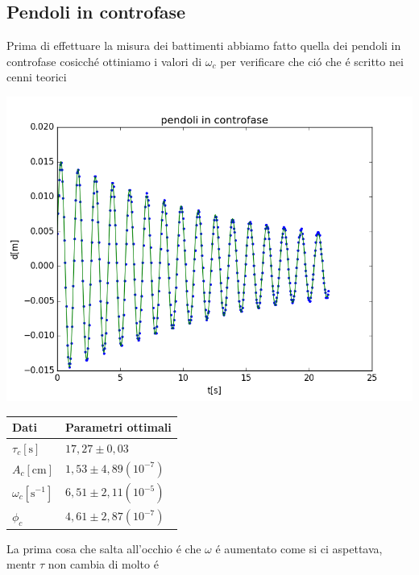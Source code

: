 \documentclass{exam}
\begin{document}
		\subsection{Pendoli in controfase}
			Prima di effettuare la misura dei battimenti abbiamo fatto quella dei pendoli in controfase cosicch\'e ottiniamo i valori di $\omega_{c}$ per verificare che ci\'o che \'e scritto nei cenni teorici\\
			\begin{minipage}{0.5\textwidth}
				\includegraphics[width=\textwidth]{controfase}
				\end{minipage}
			\begin{minipage}{0.5\textwidth}
				\begin{tabular}{ll}
					\toprule
					Dati & Parametri ottimali \\
					\midrule
					$\tau_{c}[\textrm{s}]$ & $17,27 \pm 0,03$ \\
					$A_{c}[\textrm{cm}]$ & $1,53 \pm 4,89(10^{-7})$\\
					$\omega_{c}[{\textrm{s}^{-1}}]$ & $6,51 \pm 2,11(10^{-5})$\\			
					$\phi_{c}$ & $4,61 \pm 2,87(10^{-7})$\\
					\bottomrule
				\end{tabular}
			\end{minipage}
			La prima cosa che salta all'occhio \'e che $\omega$ \'e aumentato come si ci aspettava, mentr $\tau$ non cambia di molto \'e
\end{document}
